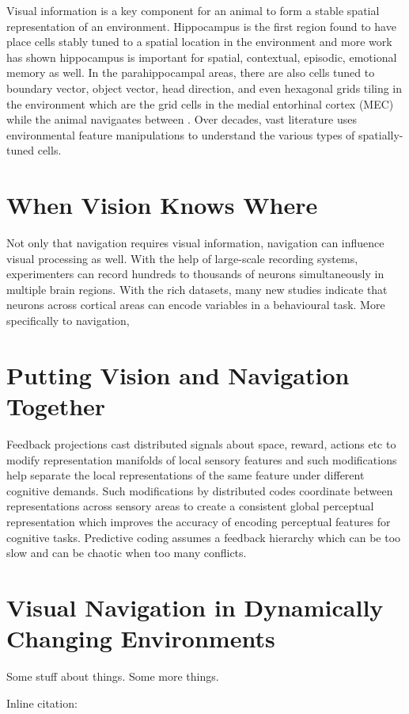 Visual information is a key component for an animal to form a stable spatial representation of an environment. Hippocampus is the first region found to have place cells stably tuned to a spatial location in the environment and more work has shown hippocampus is important for spatial, contextual, episodic, emotional memory as well. In the parahippocampal areas, there are also cells tuned to boundary vector, object vector, head direction, and even hexagonal grids tiling in the environment which are the grid cells in the medial entorhinal cortex (MEC) while the animal navigaates between . Over decades, vast literature uses environmental feature manipulations to understand the various types of spatially-tuned cells. 

\section{When Vision Knows Where}
Not only that navigation requires visual information, navigation can influence visual processing as well. With the help of large-scale recording systems, experimenters can record hundreds to thousands of neurons simultaneously in multiple brain regions. With the rich datasets, many new studies indicate that neurons across cortical areas can encode variables in a behavioural task. More specifically to navigation, 

\section{Putting Vision and Navigation Together}

Feedback projections cast distributed signals about space, reward, actions etc to modify representation manifolds of local sensory features and such modifications help separate the local representations of the same feature under different cognitive demands. Such modifications by distributed codes coordinate between representations across sensory areas to create a consistent global perceptual representation which improves the accuracy of encoding perceptual features for cognitive tasks. Predictive coding assumes a feedback hierarchy which can be too slow and can be chaotic when too many conflicts.
\section{Visual Navigation in Dynamically Changing Environments}

Some stuff about things.\cite{example-citation} Some more things. 

Inline citation: 

\blindtext

